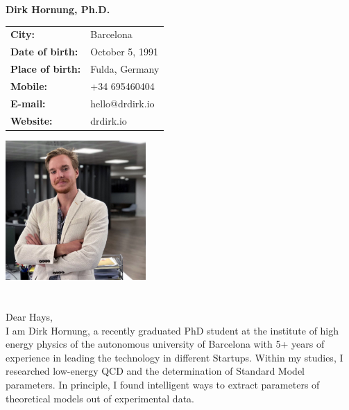 \documentclass[11pt]{article}
\begin{document}
\Large
\noindent
\textbf{Dirk Hornung, Ph.D.} \\

\normalsize
\noindent
\begin{minipage}{0.5\linewidth}
  \begin{tabularx}{0.6\textwidth}{>{\bfseries}l l}
    City:           & Barcelona \\
    Date of birth:  & October 5, 1991\\
    Place of birth: & Fulda, Germany \\
    Mobile:         & +34 695460404 \\
    E-mail:         & hello@drdirk.io \\
    Website:      	& drdirk.io
  \end{tabularx}
\end{minipage}
\begin{minipage}{0.5\linewidth}
  \begin{flushright}
    \includegraphics[width=0.4\textwidth]{dirk.png}
  \end{flushright}
\end{minipage}

\section*{}
\vspace{1cm}
Dear Hays, \\

\noindent I am Dirk Hornung, a recently graduated PhD student at the
institute of high energy physics of the autonomous university of Barcelona with
5+ years of experience in leading the technology in different Startups. Within
my studies, I researched low-energy QCD and the determination of Standard
Model parameters. In principle, I found intelligent ways to extract parameters of
theoretical models out of experimental data. \\
\end{document}
